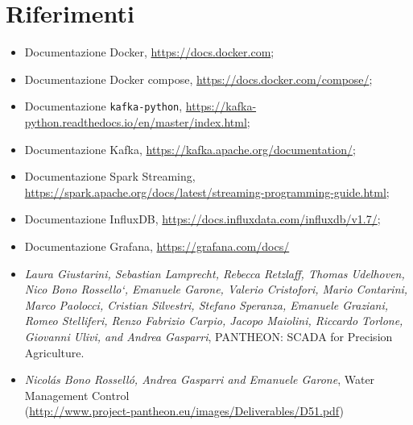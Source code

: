 \section{Riferimenti}

\begin{itemize}
    \item Documentazione Docker, \url{https://docs.docker.com};
    \item Documentazione Docker compose, \url{https://docs.docker.com/compose/};
    \item Documentazione \texttt{kafka-python}, \url{https://kafka-python.readthedocs.io/en/master/index.html};
    \item Documentazione Kafka, \url{https://kafka.apache.org/documentation/};
    \item Documentazione Spark Streaming, \\ \url{https://spark.apache.org/docs/latest/streaming-programming-guide.html};
    \item Documentazione InfluxDB, \url{https://docs.influxdata.com/influxdb/v1.7/};
    \item Documentazione Grafana, \url{https://grafana.com/docs/}
    \item \textit{Laura Giustarini, Sebastian Lamprecht, Rebecca Retzlaff, Thomas Udelhoven, Nico Bono Rossello`, Emanuele Garone, Valerio Cristofori, Mario Contarini, Marco Paolocci, Cristian Silvestri, Stefano Speranza, Emanuele Graziani, Romeo Stelliferi, Renzo Fabrizio Carpio, Jacopo Maiolini, Riccardo Torlone, Giovanni Ulivi, and Andrea Gasparri}, PANTHEON: SCADA for Precision Agriculture.
    \item \textit{Nicolás Bono Rosselló, Andrea Gasparri and Emanuele Garone}, Water Management Control \\ (\url{http://www.project-pantheon.eu/images/Deliverables/D51.pdf})
\end{itemize}{}